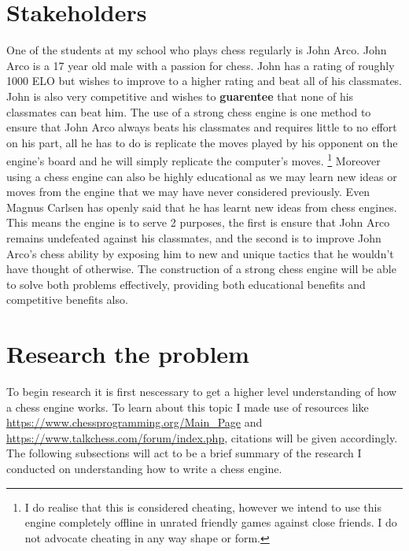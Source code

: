 \section{Stakeholders}
One of the students at my school who plays chess regularly is 
John Arco. John Arco is a 17 year old male with a passion for chess.
John has a rating of roughly 1000 ELO but wishes 
to improve to a higher rating and beat all of his 
classmates. John is also very competitive and wishes to 
\textbf{guarentee} that none of his classmates can beat him.
The use of a strong chess engine is one method to ensure
that John Arco always beats his classmates and requires little
to no effort on his part, all he has to do is replicate the 
moves played by his opponent on the engine's board and he 
will simply replicate the computer's moves. 
\footnote{I do realise that this is considered cheating,
however we intend to use this engine completely offline
in unrated friendly games against close friends. 
I do not advocate cheating in any way shape or form.}
Moreover using a chess engine can also be highly educational as
we may learn new ideas or moves from the engine that we may have
never considered previously. Even Magnus Carlsen
has openly said that he has learnt new ideas from chess engines.
\cite{lex} This means the engine is to serve 2 purposes,
the first is ensure that John Arco remains undefeated 
against his classmates, and the second is to improve John Arco's
chess ability by exposing him to new and unique tactics that 
he wouldn't have thought of otherwise. The construction of 
a strong chess engine will be able to solve both problems
effectively, providing both educational benefits and 
competitive benefits also.

\section{Research the problem}
To begin research it is first nescessary to get a higher level understanding
of how a chess engine works. To learn about this topic
I made use of resources like \url{https://www.chessprogramming.org/Main_Page}
and \url{https://www.talkchess.com/forum/index.php}, citations will be 
given accordingly. The following subsections will act to be 
a brief summary of the research I conducted on understanding
how to write a chess engine.\\


